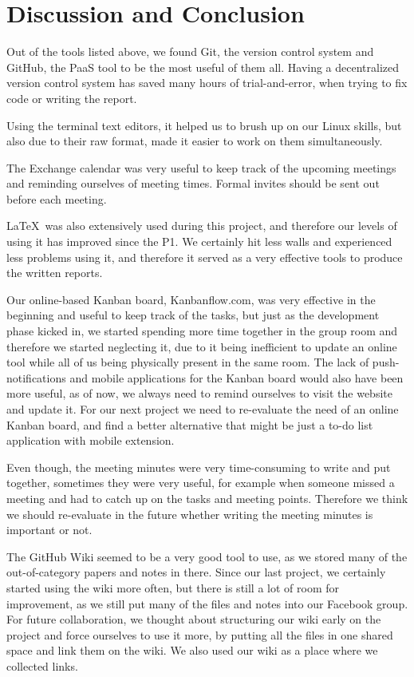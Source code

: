 \section{Discussion and Conclusion}
Out of the tools listed above, we found Git, the version control system and GitHub, the PaaS tool to be the most useful of them all. Having a decentralized version control system has saved many hours of trial-and-error, when trying to fix code or writing the report. 

Using the terminal text editors, it helped us to brush up on our Linux skills, but also due to their raw format, made it easier to work on them simultaneously. 

The Exchange calendar was very useful to keep track of the upcoming meetings and reminding ourselves of meeting times. Formal invites should be sent out before each meeting.

\LaTeX ~was also extensively used during this project, and therefore our levels of using it has improved since the P1. We certainly hit less walls and experienced less problems using it, and therefore it served as a very effective tools to produce the written reports.

Our online-based Kanban board, Kanbanflow.com, was very effective in the beginning and useful to keep track of the tasks, but just as the development phase kicked in, we started spending more time together in the group room and therefore we started neglecting it, due to it being inefficient to update an online tool while all of us being physically present in the same room. The lack of push-notifications and mobile applications for the Kanban board would also have been more useful, as of now, we always need to remind ourselves to visit the website and update it. For our next project we need to re-evaluate the need of an online Kanban board, and find a better alternative that might be just a to-do list application with mobile extension.

Even though, the meeting minutes were very time-consuming to write and put together, sometimes they were very useful, for example when someone missed a meeting and had to catch up on the tasks and meeting points. Therefore we think we should re-evaluate in the future whether writing the meeting minutes is important or not.

The GitHub Wiki seemed to be a very good tool to use, as we stored many of the out-of-category papers and notes in there. Since our last project, we certainly started using the wiki more often, but there is still a lot of room for improvement, as we still put many of the files and notes into our Facebook group. For future collaboration, we thought about structuring our wiki early on the project and force ourselves to use it more, by putting all the files in one shared space and link them on the wiki. We also used our wiki as a place where we collected links.
